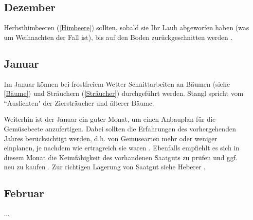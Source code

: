 \subsection{Dezember}

Herbsthimbeeren (\ref{Himbeere}) sollten, sobald sie Ihr Laub abgeworfen haben (was um Weihnachten der Fall ist), bis auf den Boden zurückgeschnitten werden \cite[S.~421]{Don2021}.

\subsection{Januar}

Im Januar können bei frostfreiem Wetter Schnittarbeiten an \textrightarrow Bäumen (siehe \ref{Bäume}) und \textrightarrow Sträuchern (\ref{Sträucher}) durchgeführt werden.
Stangl \cite[S.~256]{Stangl1995} spricht vom ``Auslichten" der Ziersträucher und älterer Bäume.

Weiterhin ist der Januar ein guter Monat, um einen Anbauplan für die Gemüsebeete anzufertigen.
Dabei sollten die Erfahrungen des vorhergehenden Jahres berücksichtigt werden, d.h. von Gemüsearten mehr oder weniger einplanen, je nachdem wie ertragreich sie waren \cite[S.~256]{Stangl1995}.
Ebenfalls empfiehlt es sich in diesem Monat die Keimfähigkeit des vorhandenen Saatguts zu prüfen und ggf. neu zu kaufen \cite[S.~216]{Heberer2018}.
Zur richtigen Lagerung von Saatgut siehe Heberer \cite[S.~179]{Heberer2018}.

\subsection{Februar}

...
